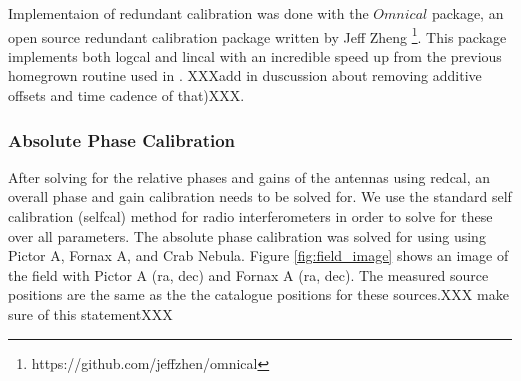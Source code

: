 \documentclass[twocolumn,numberedappendix]{emulateapj}
\begin{document}
Implementaion of redundant calibration was done with the ${Omnical}$ package, an
open source redundant calibration package written by Jeff
Zheng \footnote{https://github.com/jeffzhen/omnical}\cite{zheng_et_al2014}. This
package implements both logcal and lincal with an incredible speed up from
the previous homegrown routine used in \cite{parsons_et_al2014a}. 
XXXadd in duscussion about removing additive offsets and time cadence of
that)XXX.

\subsubsection{Absolute Phase Calibration}
%

After solving for the relative phases and gains of the antennas using redcal, an
overall phase and gain calibration needs to be solved for. We use the standard self
calibration (selfcal) method for radio interferometers in order to solve for
these over all parameters. The absolute phase calibration was solved for using using 
Pictor A, Fornax A, and Crab Nebula. Figure \ref{fig:field_image} shows an
image of the field with Pictor A (ra, dec)  and Fornax A (ra, dec). The
measured source positions are the same as the the catalogue positions for these
sources.XXX make sure of this statementXXX
\end{document}
